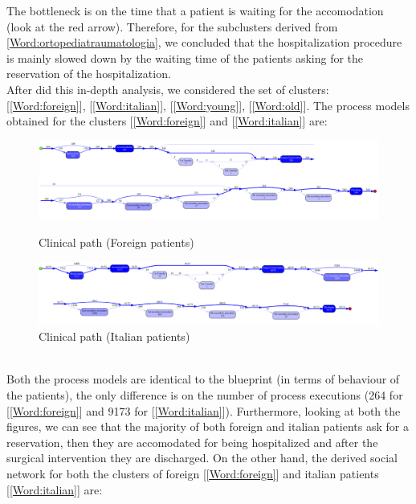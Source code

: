 The bottleneck is on the time that a patient is waiting for the accomodation (look at the red arrow). Therefore, for the subclusters derived from \ref{Word:ortopediatraumatologia}, we concluded that the hospitalization procedure is mainly slowed down by the waiting time of the patients asking for the reservation of the hospitalization.\\
After did this in-depth analysis, we considered the set of clusters: [\ref{Word:foreign}], [\ref{Word:italian}], [\ref{Word:young}],  [\ref{Word:old}]. The process models obtained for the clusters [\ref{Word:foreign}] and [\ref{Word:italian}] are:
\begin{figure} [htbp]
\includegraphics[width=\textwidth]{RicoveriInductiveVisualMinerForeigns}
\caption{Clinical path (Foreign patients)}
\includegraphics[width=\textwidth]{RicoveriInductiveVisualMinerItalian}
\caption{Clinical path (Italian patients)}
\end{figure}\\
Both the process models are identical to the blueprint (in terms of behaviour of the patients), the only difference is on the number of process executions (264 for [\ref{Word:foreign}] and 9173 for [\ref{Word:italian}]). Furthermore, looking at both the figures, we can see that the majority of both foreign and italian patients ask for a reservation, then they are accomodated for being hospitalized and after the surgical intervention they are discharged. On the other hand, the derived social network for both the clusters of foreign [\ref{Word:foreign}] and italian patients [\ref{Word:italian}] are:
